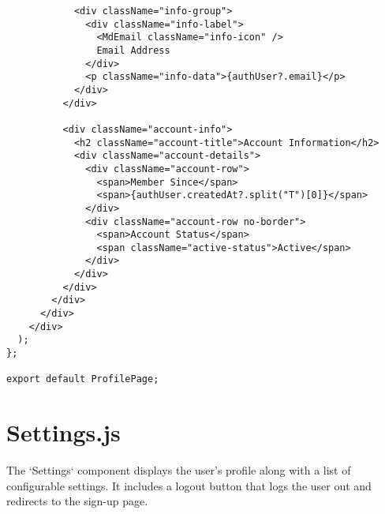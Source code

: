 \documentclass[12pt,a4paper]{report}
\begin{document}
\begin{lstlisting}
            <div className="info-group">
              <div className="info-label">
                <MdEmail className="info-icon" />
                Email Address
              </div>
              <p className="info-data">{authUser?.email}</p>
            </div>
          </div>

          <div className="account-info">
            <h2 className="account-title">Account Information</h2>
            <div className="account-details">
              <div className="account-row">
                <span>Member Since</span>
                <span>{authUser.createdAt?.split("T")[0]}</span>
              </div>
              <div className="account-row no-border">
                <span>Account Status</span>
                <span className="active-status">Active</span>
              </div>
            </div>
          </div>
        </div>
      </div>
    </div>
  );
};

export default ProfilePage;
\end{lstlisting}


\section{Settings.js}

The `Settings` component displays the user’s profile along with a list of configurable settings. It includes a logout button that logs the user out and redirects to the sign-up page.

\end{document}
